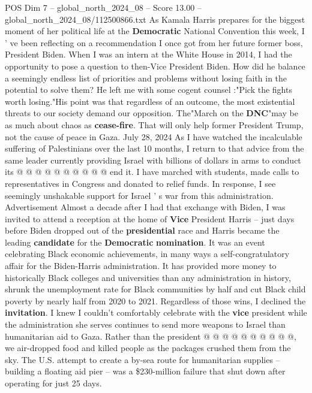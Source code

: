 \begin{textsample}{POS Dim 7 – global\_north\_2024\_08 – Score 13.00 – global\_north\_2024\_08/112500866.txt}  \label{ex:f7_pos_009}
As Kamala Harris prepares for the biggest moment of her political life at the \textbf{Democratic} National Convention this week, I ' ve been reflecting on a recommendation I once got from her future former boss, President Biden.
When I was an intern at the White House in 2014, I had the opportunity to pose a question to then-Vice President Biden.
How did he balance a seemingly endless list of priorities and problems without losing faith in the potential to solve them?
He left me with some cogent counsel :"Pick the fights worth losing."His point was that regardless of an outcome, the most existential threats to our society demand our opposition.
The"March on the \textbf{DNC}"may be as much about chaos as \textbf{cease-fire}.
That will only help former President Trump, not the cause of peace in Gaza.
July 28, 2024 As I have watched the incalculable suffering of Palestinians over the last 10 months, I return to that advice from the same leader currently providing Israel with billions of dollars in arms to conduct its @ @ @ @ @ @ @ @ @ @ end it.
I have marched with students, made calls to representatives in Congress and donated to relief funds.
In response, I see seemingly unshakable support for Israel ' s war from this administration.
Advertisement Almost a decade after I had that exchange with Biden, I was invited to attend a reception at the home of \textbf{Vice} President Harris -- just days before Biden dropped out of the \textbf{presidential} race and Harris became the leading \textbf{candidate} for the \textbf{Democratic} \textbf{nomination}.
It was an event celebrating Black economic achievements, in many ways a self-congratulatory affair for the Biden-Harris administration.
It has provided more money to historically Black colleges and universities than any administration in history, shrunk the unemployment rate for Black communities by half and cut Black child poverty by nearly half from 2020 to 2021.
Regardless of those wins, I declined the \textbf{invitation}.
I knew I couldn't comfortably celebrate with the \textbf{vice} president while the administration she serves continues to send more weapons to Israel than humanitarian aid to Gaza.
Rather than the president @ @ @ @ @ @ @ @ @ @, we air-dropped food and killed people as the packages crushed them from the sky.
The U.S. attempt to create a by-sea route for humanitarian supplies -- building a floating aid pier -- was a \$230-million failure that shut down after operating for just 25 days.

\end{textsample}
